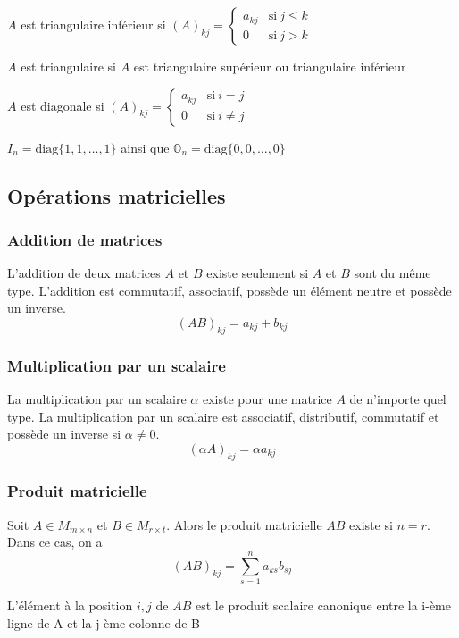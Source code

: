 \begin{definition}
    $A$ est triangulaire inférieur si $(A)_{kj} = \begin{cases}
            a_{kj} & \text{si} \ j \leq k \\
            0      & \text{si} \ j > k
        \end{cases}$
\end{definition}
\begin{remark}
    $A$ est triangulaire si $A$ est triangulaire supérieur ou triangulaire inférieur
\end{remark}
\begin{definition}
    $A$ est diagonale si $(A)_{kj} = \begin{cases}
            a_{kj} & \text{si} \ i = j    \\
            0      & \text{si} \ i \neq j
        \end{cases}$
    \begin{remark}
        $I_n = \text{diag}\{ 1, 1, \dots, 1 \}$ ainsi que $\mathbb{O}_n = \text{diag}\{ 0, 0, \dots, 0 \}$
    \end{remark}
\end{definition}


\subsection{Opérations matricielles}

\subsubsection{Addition de matrices}
L'addition de deux matrices $A$ et $B$ existe seulement si $A$ et $B$ sont du même type.
L'addition est commutatif, associatif, possède un élément neutre et possède un inverse.
\[ (AB)_{kj} = a_{kj} + b_{kj} \]

\subsubsection{Multiplication par un scalaire}
La multiplication par un scalaire $\alpha$ existe pour une matrice $A$ de n'importe quel type. La multiplication
par un scalaire est associatif, distributif, commutatif et possède un inverse si $\alpha \neq 0$.
\[ (\alpha A)_{kj} = \alpha a_{kj}\]

\subsubsection{Produit matricielle}
Soit $A \in M_{m \times n}$ et $B \in M_{r \times t}$. Alors
le produit matricielle $AB$ existe si $n = r$. Dans ce cas, on a \[
    (AB)_{kj} = \sum_{s = 1}^{n} a_{ks} b_{sj}
\]
\begin{remark}
    L'élément à la position $i, j$ de $AB$ est le produit scalaire canonique entre la i-ème ligne
    de A et la j-ème colonne de B
\end{remark}

